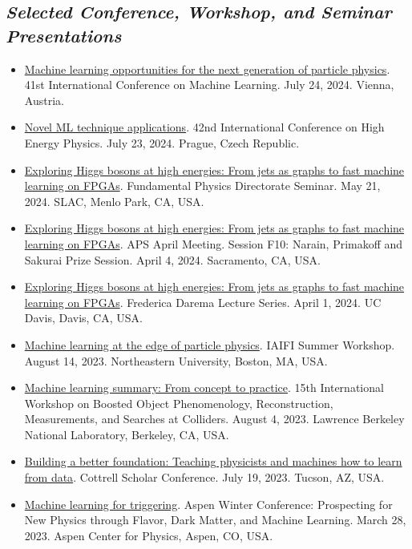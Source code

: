 \documentclass[11pt]{res}
\newcommand{\MarginText}[1]{\section{\textit{#1}}}
\begin{document}
\begin{resume}
  \MarginText{Selected Conference, Workshop, and Seminar Presentations}

  \begin{itemize}
    \itemsep-0.3em
    \item \href{https://icml.cc/virtual/2024/invited-talk/35254}{Machine learning opportunities for the next generation of particle physics}. 41st International Conference on Machine Learning. July 24, 2024. Vienna, Austria.
    \item \href{https://indico.cern.ch/event/1291157/contributions/5958213/}{Novel ML technique applications}. 42nd International Conference on High Energy Physics. July 23, 2024. Prague, Czech Republic.
    \item \href{https://indico.slac.stanford.edu/event/8784/}{Exploring Higgs bosons at high energies: From jets as graphs to fast machine learning on FPGAs}. Fundamental Physics Directorate Seminar. May 21, 2024. SLAC, Menlo Park, CA, USA.
    \item \href{https://meetings.aps.org/Meeting/APR24/Session/F10.2}{Exploring Higgs bosons at high energies: From jets as graphs to fast machine learning on FPGAs}. APS April Meeting. Session F10: Narain, Primakoff and Sakurai Prize Session. April 4, 2024. Sacramento, CA, USA.
    \item \href{https://daremalectures.physics.ucdavis.edu/speakers/}{Exploring Higgs bosons at high energies: From jets as graphs to fast machine learning on FPGAs}. Frederica Darema Lecture Series. April 1, 2024. UC Davis, Davis, CA, USA.
    \item \href{https://iaifi.org/summer-workshop.html}{Machine learning at the edge of particle physics}. IAIFI Summer Workshop. August 14, 2023. Northeastern University, Boston, MA, USA.
    \item \href{https://indico.physics.lbl.gov/event/975/contributions/8195/}{Machine learning summary: From concept to practice}. 15th International Workshop on Boosted Object Phenomenology, Reconstruction, Measurements, and Searches at Colliders. August 4, 2023. Lawrence Berkeley National Laboratory, Berkeley, CA, USA.
    \item \href{https://rescorp.org/cottrell-scholars/cottrell-scholars-conference}{Building a better foundation: Teaching physicists and machines how to learn from data}. Cottrell Scholar Conference. July 19, 2023. Tucson, AZ, USA.
    \item \href{https://indico.fnal.gov/event/21471/contributions/259113/}{Machine learning for triggering}. Aspen Winter Conference: Prospecting for New Physics through Flavor, Dark Matter, and Machine Learning. March 28, 2023. Aspen Center for Physics, Aspen, CO, USA.

\end{itemize}
\end{resume}
\end{document}
